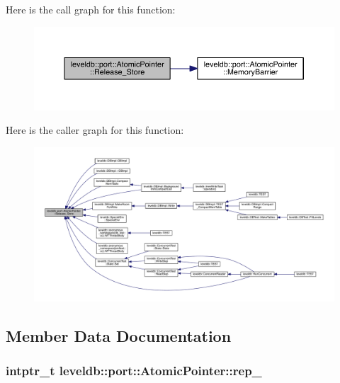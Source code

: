 Here is the call graph for this function\+:\nopagebreak
\begin{figure}[H]
\begin{center}
\leavevmode
\includegraphics[width=350pt]{classleveldb_1_1port_1_1_atomic_pointer_a8dfe51c125f71c09a363dae042be63a7_cgraph}
\end{center}
\end{figure}




Here is the caller graph for this function\+:
\nopagebreak
\begin{figure}[H]
\begin{center}
\leavevmode
\includegraphics[width=350pt]{classleveldb_1_1port_1_1_atomic_pointer_a8dfe51c125f71c09a363dae042be63a7_icgraph}
\end{center}
\end{figure}




\subsection{Member Data Documentation}
\hypertarget{classleveldb_1_1port_1_1_atomic_pointer_a3403f113d32302b77d328e53c6bafcb5}{}
\subsubsection[{rep\+\_\+}]{\setlength{\rightskip}{0pt plus 5cm}intptr\+\_\+t leveldb\+::port\+::\+Atomic\+Pointer\+::rep\+\_\+\hspace{0.3cm}{\ttfamily [private]}}\label{classleveldb_1_1port_1_1_atomic_pointer_a3403f113d32302b77d328e53c6bafcb5}
\hypertarget{classleveldb_1_1port_1_1_atomic_pointer_a0c361771aa542cece902c4b5d2a9466a}{}
